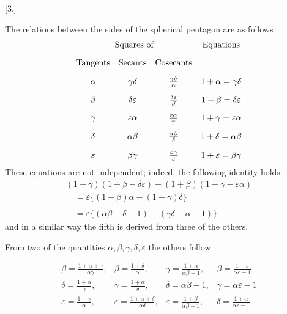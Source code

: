 \begingroup
\renewcommand{\arraystretch}{1.45}
\fancyhead[L]{}
\par\medskip{}\centerline{[3.]}\nobreak\smallskip
The relations between the sides of the spherical pentagon are as follows
\begingroup\small\setlength{\arraycolsep}{3pt}\[
\begin{array}{cccc} \multicolumn{3}{c}{\text{Squares of}}&\text{Equations}\\[9pt] \text{Tangents}&\text{Secants}&\text{Cosecants}&\\[9pt] \alpha&\gamma\delta&\frac{\gamma\delta}{\alpha}&1+\alpha=\gamma\delta\\[9pt] \beta&\delta\varepsilon&\frac{\delta\varepsilon}{\beta}&1+\beta=\delta\varepsilon\\[9pt] \gamma&\varepsilon\alpha&\frac{\varepsilon\alpha}{\gamma}&1+\gamma=\varepsilon\alpha\\[9pt] \delta&\alpha\beta&\frac{\alpha\beta}{\delta}&1+\delta=\alpha\beta\\[9pt] \varepsilon&\beta\gamma&\frac{\beta\gamma}{\varepsilon}&1+\varepsilon=\beta\gamma \end{array}
\]\endgroup
These equations are not independent; indeed, the following identity holds:
\[
\begin{gathered} (1+\gamma)(1+\beta-\delta\varepsilon) -(1+\beta)(1+\gamma-\varepsilon\alpha) \\[9pt]\quad{}=\varepsilon\{(1+\beta)\alpha-(1+\gamma)\delta\}\\[9pt] \\[9pt]\quad{}=\varepsilon\{(\alpha\beta-\delta-1)-(\gamma\delta-\alpha-1)\} \end{gathered}
\]
and in a similar way the fifth is derived from three of the others.

From two of the quantities $\alpha,\beta,\gamma,\delta,\varepsilon$ the others follow
\par\nopagebreak%
\begingroup\small\setlength{\arraycolsep}{2pt}\[
\begin{array}{llll} \beta=\frac{1+\alpha+\gamma}{\alpha\gamma}, &\beta=\frac{1+\delta}{\alpha}, &\gamma=\frac{1+\alpha}{\alpha\beta-1}, &\beta=\frac{1+\varepsilon}{\alpha\varepsilon-1}\\[9pt] \delta=\frac{1+\alpha}{\gamma}, &\gamma=\frac{1+\alpha}{\delta}, &\delta=\alpha\beta-1, &\gamma=\alpha\varepsilon-1\\[9pt] \varepsilon=\frac{1+\gamma}{\alpha}, &\varepsilon=\frac{1+\alpha+\delta}{\alpha\delta}, &\varepsilon=\frac{1+\beta}{\alpha\beta-1}, &\delta=\frac{1+\alpha}{\alpha\varepsilon-1} \end{array}
\]\endgroup\par%


